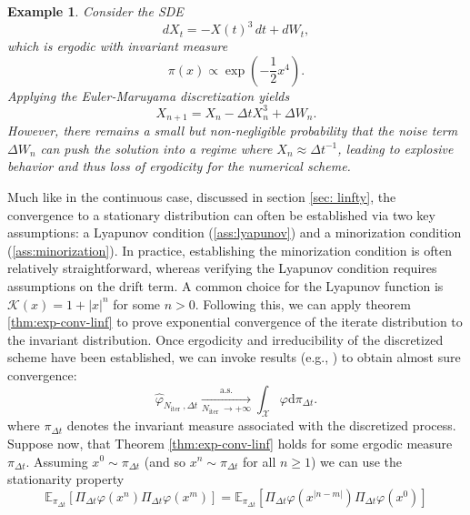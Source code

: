 \documentclass[11pt, twoside]{report}
\newtheorem{example}[theorem]{Example}
\begin{document}
\begin{example}
Consider the SDE
\[
dX_t = -X(t)^3\,dt + dW_t,
\]
which is ergodic with invariant measure
\[
\pi(x) \propto \exp\left(-\frac{1}{2}x^4\right).
\]
Applying the Euler-Maruyama discretization yields
\[
X_{n+1} = X_n - \Delta t X_n^3 + \Delta W_n.
\]
However, there remains a small but non-negligible probability that the noise term $\Delta W_n$ can push the solution into a regime where $X_n \approx \Delta t^{-1}$, leading to explosive behavior and thus loss of ergodicity for the numerical scheme.
\end{example}
Much like in the continuous case, discussed in section \ref{sec: linfty}, the convergence to a stationary distribution can often be established via two key assumptions: a Lyapunov condition (\ref{ass:lyapunov}) and a minorization condition (\ref{ass:minorization}). In practice, establishing the minorization condition is often relatively straightforward, whereas verifying the Lyapunov condition requires assumptions on the drift term\cite{mattingly2002ergodicity}. A common choice for the Lyapunov function is $\mathcal{K}(x) = 1 + |x|^n$ for some $n > 0$. Following this, we can apply theorem \ref{thm:exp-conv-linf} to prove exponential convergence of the iterate distribution to the invariant distribution. Once ergodicity and irreducibility of the discretized scheme have been established, we can invoke results (e.g., \cite[Chapter~17]{Meyn2012-oq}) to obtain almost sure convergence:
\begin{equation}
\widehat{\varphi}_{N_{\text {iter }}, \Delta t} \xrightarrow[N_{\text {iter }} \rightarrow+\infty]{\text { a.s. }} \int_{\mathcal{X}} \varphi \mathrm{d} \pi_{\Delta t} .
\end{equation}
where $\pi_{\Delta t}$ denotes the invariant measure associated with the discretized process.
Suppose now, that Theorem \ref{thm:exp-conv-linf} holds for some ergodic measure $\pi_{\Delta t}$. Assuming $x^0 \sim \pi_{\Delta t}$ (and so $x^n \sim \pi_{\Delta t}$ for all $n\geq 1$) we can use the stationarity property
\begin{equation}
\mathbb{E}_{\pi_{\Delta t}}\left[\Pi_{\Delta t} \varphi\left(x^n\right) \Pi_{\Delta t} \varphi\left(x^m\right)\right]=\mathbb{E}_{\pi_{\Delta t}}\left[\Pi_{\Delta t} \varphi\left(x^{|n-m|}\right) \Pi_{\Delta t} \varphi\left(x^0\right)\right]
\end{equation}
\end{document}
